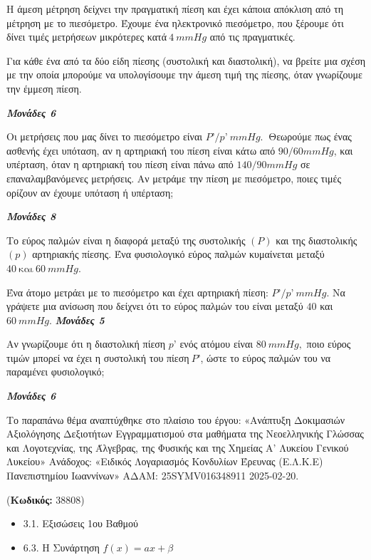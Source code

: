 \documentclass[11pt,a4paper,twoside]{book}
\newcounter{askhsh}[chapter]
\renewcommand{\theaskhsh}{
	\bf{\titlefont{\Large{\thechapter}}.\arabic{askhsh}}
}
\newcommand{\Askhsh}[2]{\refstepcounter{askhsh}{\titlefont{Άσκηση\theaskhsh} - \textcolor{maincolor}{ΘΕΜΑ #2}} ({\small{\textbf{Κωδικός:} #1}})\\}{}
\newenvironment{ylh}{
\begin{tcolorbox}[
breakable,
enhanced standard,
titlerule=0pt,
toprule=0pt, 
rightrule=0pt, 
bottomrule=0pt,
title={\titlefont Ύλη άσκησης},
colback=white,
opacityback=0,
left=2mm,
top=1mm,
bottom=0mm,
boxrule=0pt,
colframe=white,
borderline west={1.5mm}{0pt}{secondarycolor},
leftrule=2mm,
sharp corners,
coltitle=black
]
\begin{itemize}[leftmargin=3mm, itemsep=0mm, label=\textcolor{secondarycolor}{{\small\faBook}}]
}{
\end{itemize}
\end{tcolorbox}
}
\newcommand{\monades}[1]{
\hspace*{\fill}
\textbf{\textit{\textcolor{maincolor}{Μονάδες #1}}}}
\begin{document}
Η άμεση μέτρηση δείχνει την πραγματική πίεση και έχει κάποια απόκλιση από τη μέτρηση με το πιεσόμετρο. Έχουμε ένα ηλεκτρονικό πιεσόμετρο, που ξέρουμε ότι δίνει τιμές μετρήσεων μικρότερες κατά$\ 4\ mmHg$ από τις πραγματικές.

\begin{alist}
\item Για κάθε ένα από τα δύο είδη πίεσης (συστολική και διαστολική), να βρείτε μια σχέση με την οποία μπορούμε να υπολογίσουμε την άμεση τιμή της πίεσης, όταν γνωρίζουμε την έμμεση πίεση.
\monades{6}
\item Οι μετρήσεις που μας δίνει το πιεσόμετρο είναι $P’/p’\ \si{mmHg}.\ $ Θεωρούμε πως ένας ασθενής έχει υπόταση, αν η αρτηριακή του πίεση είναι κάτω από $90/60 \si{mmHg}$, και υπέρταση, όταν η αρτηριακή του πίεση είναι πάνω από $140/90 \si{mmHg}$ σε επαναλαμβανόμενες μετρήσεις. Αν μετράμε την πίεση με πιεσόμετρο, ποιες τιμές ορίζουν αν έχουμε υπόταση ή υπέρταση;

\monades{8}
\item Το εύρος παλμών είναι η διαφορά μεταξύ της συστολικής $(P)$ και της διαστολικής $(p)$ αρτηριακής πίεσης. Ένα φυσιολογικό εύρος παλμών κυμαίνεται μεταξύ $40\ \text{και}\ 60\ mmHg.$

\end{alist}
\begin{alist}
\item
  Ένα άτομο μετράει με το πιεσόμετρο και έχει αρτηριακή πίεση: $P’/p’\ \si{mmHg}.$ Να γράψετε μια ανίσωση που δείχνει ότι το εύρος παλμών του είναι μεταξύ $40$ και $60\ \si{mmHg}.$\monades{5}
\end{alist}
\begin{alist}
\item
  Αν γνωρίζουμε ότι η διαστολική πίεση $p’$ ενός ατόμου είναι $80\ mmHg,$ ποιο εύρος τιμών μπορεί να έχει η συστολική του πίεση$\ P’$, ώστε το εύρος παλμών του να παραμένει φυσιολογικό;
\monades{6}

{\footnotesize Το παραπάνω θέμα αναπτύχθηκε στο πλαίσιο του έργου: «Ανάπτυξη Δοκιμασιών Αξιολόγησης Δεξιοτήτων Εγγραμματισμού στα μαθήματα της Νεοελληνικής Γλώσσας και Λογοτεχνίας, της Άλγεβρας, της Φυσικής και της Χημείας Α' Λυκείου Γενικού Λυκείου» Ανάδοχος: «Ειδικός Λογαριασμός Κονδυλίων Έρευνας (Ε.Λ.Κ.Ε) Πανεπιστημίου Ιωαννίνων» ΑΔΑΜ: 25SYMV016348911 2025-02-20.}
\end{alist}

\vspace{4mm}
\Askhsh{38808}{4}
\begin{ylh}
    \item 3.1. Εξισώσεις 1ου Βαθμού
    \item 6.3. Η Συνάρτηση $f(x)=ax+\beta$
\end{ylh}
\end{document}
